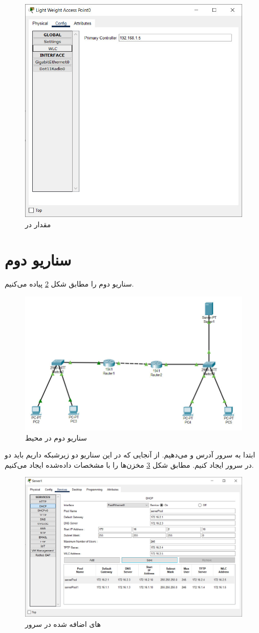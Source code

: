 \documentclass{article}
\begin{document}
 \begin{figure}[h!]
	\centering
	\includegraphics[width=0.5\columnwidth]{figs/s-1-ap.jpg}
	\caption{مقدار  در }
	\label{fig:s-1-ap}
\end{figure}

\section{سناریو دوم}
سناریو دوم را مطابق شکل \ref{fig:s-2} پیاده می‌کنیم.
\begin{figure}[h!]
	\centering
	\includegraphics[width=0.5\columnwidth]{figs/s-2.jpg}
	\caption{سناریو دوم در محیط }
	\label{fig:s-2}
\end{figure}

ابتدا به سرور آدرس  و  می‌دهیم. از آنجایی که در این سناریو دو زیرشبکه داریم باید دو  در سرور ایجاد کنیم. مطابق شکل \ref{fig:s-2-server-pool} مخزن‌ها را با مشخصات داده‌شده ایجاد می‌کنیم.
 \begin{figure}[h!]
	\centering
	\includegraphics[width=0.5\columnwidth]{figs/s-2-server-pool.jpg}
	\caption{های اضافه شده در سرور}
	\label{fig:s-2-server-pool}
\end{figure}
\end{document}
